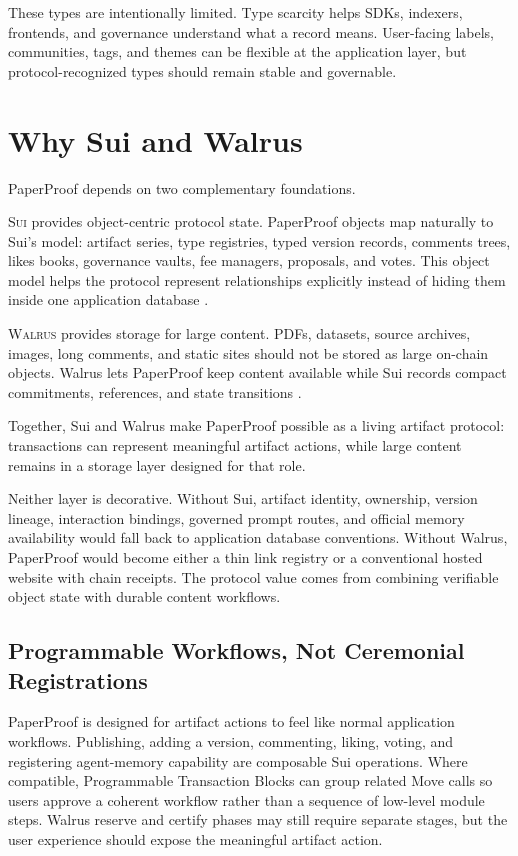 \documentclass[11pt]{article}
\newcommand{\sui}{\textsc{Sui}}
\newcommand{\walrus}{\textsc{Walrus}}
\begin{document}
These types are intentionally limited. Type scarcity helps SDKs, indexers,
frontends, and governance understand what a record means. User-facing labels,
communities, tags, and themes can be flexible at the application layer, but
protocol-recognized types should remain stable and governable.

\section{Why Sui and Walrus}

PaperProof depends on two complementary foundations.

\sui{} provides object-centric protocol state. PaperProof objects map naturally
to Sui's model: artifact series, type registries, typed version records,
comments trees, likes books, governance vaults, fee managers, proposals, and
votes. This object model helps the protocol represent relationships explicitly
instead of hiding them inside one application database \cite{sui_platform,sui_move}.

\walrus{} provides storage for large content. PDFs, datasets, source archives,
images, long comments, and static sites should not be stored as large on-chain
objects. Walrus lets PaperProof keep content available while Sui records compact
commitments, references, and state transitions \cite{walrus_storage}.

Together, Sui and Walrus make PaperProof possible as a living artifact protocol:
transactions can represent meaningful artifact actions, while large content
remains in a storage layer designed for that role.

Neither layer is decorative. Without Sui, artifact identity, ownership,
version lineage, interaction bindings, governed prompt routes, and official
memory availability would fall back to application database conventions.
Without Walrus, PaperProof would become either a thin link registry or a
conventional hosted website with chain receipts. The protocol value comes from
combining verifiable object state with durable content workflows.

\subsection{Programmable Workflows, Not Ceremonial Registrations}

PaperProof is designed for artifact actions to feel like normal application
workflows. Publishing, adding a version, commenting, liking, voting, and
registering agent-memory capability are composable Sui operations. Where
compatible, Programmable Transaction Blocks can group related Move calls so
users approve a coherent workflow rather than a sequence of low-level module
steps. Walrus reserve and certify phases may still require separate stages, but
the user experience should expose the meaningful artifact action.
\end{document}
